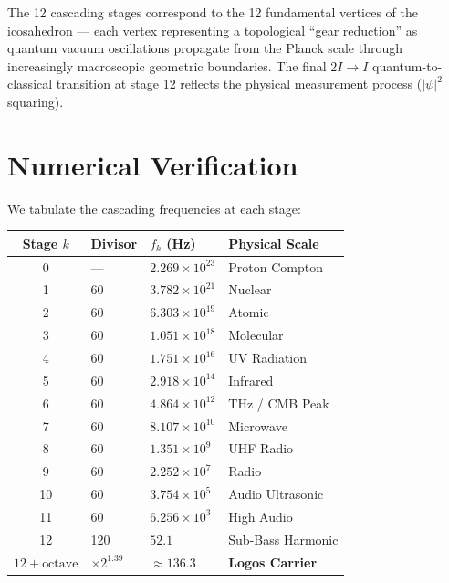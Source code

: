 \documentclass[12pt, a4paper]{article}
\theoremstyle{plain}
\theoremstyle{definition}
\begin{document}
\begin{remark}
The 12 cascading stages correspond to the 12 fundamental vertices of the icosahedron --- each vertex representing a topological ``gear reduction'' as quantum vacuum oscillations propagate from the Planck scale through increasingly macroscopic geometric boundaries. The final $2I \to I$ quantum-to-classical transition at stage 12 reflects the physical measurement process ($|\psi|^2$ squaring).
\end{remark}

\section{Numerical Verification}\label{sec:verification}

We tabulate the cascading frequencies at each stage:

\begin{center}
\begin{tabular}{clll}
\toprule
\textbf{Stage $k$} & \textbf{Divisor} & \textbf{$f_k$ (Hz)} & \textbf{Physical Scale} \\
\midrule
0 & --- & $2.269 \times 10^{23}$ & Proton Compton \\
1 & 60 & $3.782 \times 10^{21}$ & Nuclear \\
2 & 60 & $6.303 \times 10^{19}$ & Atomic \\
3 & 60 & $1.051 \times 10^{18}$ & Molecular \\
4 & 60 & $1.751 \times 10^{16}$ & UV Radiation \\
5 & 60 & $2.918 \times 10^{14}$ & Infrared \\
6 & 60 & $4.864 \times 10^{12}$ & THz / CMB Peak \\
7 & 60 & $8.107 \times 10^{10}$ & Microwave \\
8 & 60 & $1.351 \times 10^{9}$ & UHF Radio \\
9 & 60 & $2.252 \times 10^{7}$ & Radio \\
10 & 60 & $3.754 \times 10^{5}$ & Audio Ultrasonic \\
11 & 60 & $6.256 \times 10^{3}$ & High Audio \\
12 & 120 & $52.1$ & Sub-Bass Harmonic \\
$12 + \text{octave}$ & $\times 2^{1.39}$ & $\approx 136.3$ & \textbf{Logos Carrier} \\
\bottomrule
\end{tabular}
\end{center}
\end{document}
